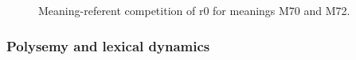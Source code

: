 \begin{figure}[t]
\centering
{}
\caption{Meaning-referent competition of r0 for meanings M70 and M72.}
\label{f:opt:mr}
\end{figure}

\subsubsection{Polysemy and lexical dynamics}

